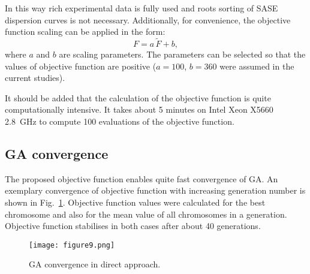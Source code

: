 \documentclass[preprint,12pt]{elsarticle}
\begin{document}
	In this way rich experimental data is fully used and roots sorting of SASE dispersion curves is not necessary. Additionally, for convenience, the objective function scaling can be applied in the form:
	\begin{equation}
	F = a \,  \tilde{F} + b,
	\end{equation}
	where \(a\) and \(b\) are scaling parameters. The parameters can be selected so that 
	the values of objective function are positive (\(a=100\), \(b=360\) were assumed in 
	the 
	current studies).
	
	It should be added that the calculation of the objective function is quite computationally intensive. It takes about 5 minutes on Intel Xeon X5660 2.8~GHz to compute 100 evaluations of the objective function. 
\subsection{GA convergence}
The proposed objective function enables quite fast convergence of GA. An exemplary convergence of objective function with increasing generation number is shown in Fig.~\ref{fig:GAconvergence}. Objective function values were calculated for the best chromosome and also for the mean value of all chromosomes in a generation. Objective function stabilises in both cases after about 40 generations.
	\begin{figure} [h!]
		\centering
		\texttt{[image: figure9.png]}
		\caption{GA convergence in direct approach.}
		\label{fig:GAconvergence}
	\end{figure}
\end{document}

